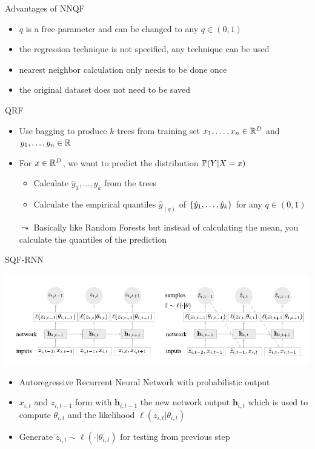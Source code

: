 \documentclass[10pt,aspectratio=169]{beamer}
\begin{document}
\begin{frame}{Advantages of NNQF}
    \begin{itemize}
        \item \(q\) is a free parameter and can be changed to any \(q\in (0,1)\)
        \item the regression technique is not specified, any technique can be used
        \item nearest neighbor calculation only needs to be done once
        \item the original dataset does not need to be saved
    \end{itemize}
\end{frame}

\begin{frame}{QRF}
    \begin{itemize}
        \item Use bagging to produce \(k\) trees from training set \(x_1, \ldots, x_n \in \R^D\) and \(y_1, \ldots, y_n \in \R\)
        \item For \(x\in \R^D\), we want to predict the distribution \(\P(Y | X=x)\)
        \begin{itemize}
            \item Calculate \(\hat{y}_1, \ldots, \hat{y}_k\) from the trees 
            \item Calculate the empirical quantiles \(\hat{y}_{(q)}\) of \(\set{\hat{y}_1, \ldots, \hat{y}_k}\) for any \(q \in (0,1)\)
        \end{itemize}
        \item[\(\leadsto\)] Basically like Random Forests but instead of calculating the mean, you calculate the quantiles of the prediction
    \end{itemize}
\end{frame}

\begin{frame}{SQF-RNN}
    \begin{center}
        \includegraphics[width=\textwidth]{plots/deepar-rnn.pdf}
    \end{center}
    \begin{itemize}
        \item Autoregressive Recurrent Neural Network with probabilistic output
        \item \(x_{i, t}\) and \(z_{i, t-1}\) form with \(\boldsymbol{h}_{i,t-1}\) the new network output \(\boldsymbol{h}_{i,t}\)
        which is used to compute \(\theta_{i,t}\) and the likelihood \(\ell(z_{i,t} | \theta_{i,t})\)
        \item Generate \(\tilde{z}_{i, t} \sim \ell(\cdot | \theta_{i,t})\) for testing from previous step
    \end{itemize}
\end{frame}
\end{document}
